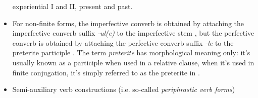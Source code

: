 \documentclass[a4paper, oneside, 12pt]{report}
\newcommand*{\citepage}[1]{p.~{#1}}
\newcommand*{\term}[1]{\emph{#1}}
\newcommand{\form}[1]{\emph{#1}}
\begin{document}
\begin{itemize}
    experiential I and II, present and past. 
    \item For non-finite forms, the imperfective converb 
    is obtained by attaching the imperfective converb suffix \form{-ul(e)} to the imperfective stem
    \citep[\citepage{306}]{forker2020grammar},
    but the perfective converb is obtained by 
    attaching the perfective converb suffix \form{-le} to the preterite participle 
    \citep[\citepage{308}]{forker2020grammar}.
    The term \term{preterite} has morphological meaning only:
    it's usually known as a participle when used in a relative clause, 
    when it's used in finite conjugation, 
    it's simply referred to as the preterite in \citet{forker2020grammar}.
    \item Semi-auxiliary verb constructions (i.e. so-called \term{periphrastic verb forms})
\end{itemize}
\end{document}
